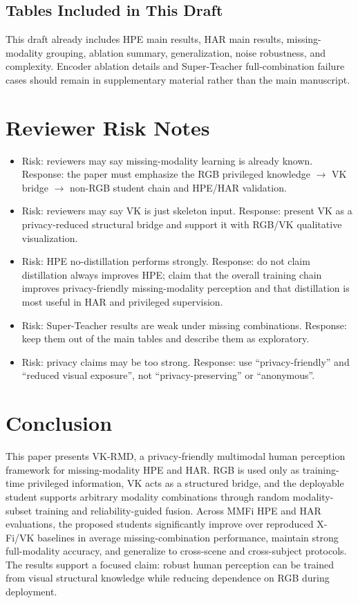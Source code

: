\documentclass[journal]{IEEEtran}
\newcommand{\ours}{VK-RMD}
\begin{document}
\subsection{Tables Included in This Draft}
This draft already includes HPE main results, HAR main results, missing-modality grouping, ablation summary, generalization, noise robustness, and complexity. Encoder ablation details and Super-Teacher full-combination failure cases should remain in supplementary material rather than the main manuscript.

\section{Reviewer Risk Notes}

\begin{itemize}
    \item Risk: reviewers may say missing-modality learning is already known. Response: the paper must emphasize the RGB privileged knowledge $\rightarrow$ VK bridge $\rightarrow$ non-RGB student chain and HPE/HAR validation.
    \item Risk: reviewers may say VK is just skeleton input. Response: present VK as a privacy-reduced structural bridge and support it with RGB/VK qualitative visualization.
    \item Risk: HPE no-distillation performs strongly. Response: do not claim distillation always improves HPE; claim that the overall training chain improves privacy-friendly missing-modality perception and that distillation is most useful in HAR and privileged supervision.
    \item Risk: Super-Teacher results are weak under missing combinations. Response: keep them out of the main tables and describe them as exploratory.
    \item Risk: privacy claims may be too strong. Response: use ``privacy-friendly'' and ``reduced visual exposure'', not ``privacy-preserving'' or ``anonymous''.
\end{itemize}

\section{Conclusion}

This paper presents \ours{}, a privacy-friendly multimodal human perception framework for missing-modality HPE and HAR. RGB is used only as training-time privileged information, VK acts as a structured bridge, and the deployable student supports arbitrary modality combinations through random modality-subset training and reliability-guided fusion. Across MMFi HPE and HAR evaluations, the proposed students significantly improve over reproduced X-Fi/VK baselines in average missing-combination performance, maintain strong full-modality accuracy, and generalize to cross-scene and cross-subject protocols. The results support a focused claim: robust human perception can be trained from visual structural knowledge while reducing dependence on RGB during deployment.
\end{document}
